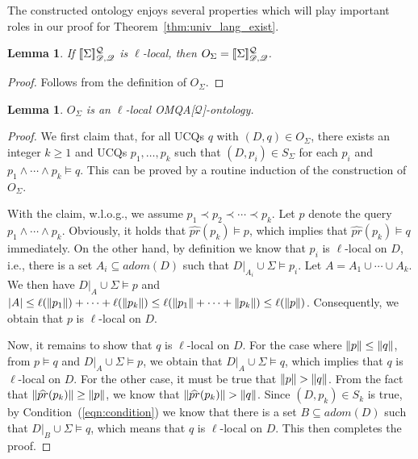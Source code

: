 \documentclass[letterpaper]{article} %
\newtheorem{lem}[thm]{Lemma}
\theoremstyle{definition}
\theoremstyle{remark}
\theoremstyle{definition}
\begin{document}
The constructed ontology enjoys several properties which will play important roles in our proof for Theorem~\ref{thm:univ_lang_exist}.

\begin{lem}\label{lem:correctness}
If $[\![\Sigma]\!]^\mathcal{Q}_{\mathscr{D},\mathscr{Q}}$ is $\ell$-local, then $O_\Sigma=[\![\Sigma]\!]^\mathcal{Q}_{\mathscr{D},\mathscr{Q}}$.
\end{lem}

\begin{proof}
Follows from the definition of $O_\Sigma$.
\end{proof}

\begin{lem}\label{lem:locality}
$O_\Sigma$ is an $\ell$-local OMQA[$\mathcal{Q}$]-ontology.
\end{lem}

\begin{proof}
We first claim that, for all UCQs $q$ with $(D,q)\in O_\Sigma$, there exists an integer $k\ge 1$ and UCQs $p_1,\dots,p_k$ such that $(D,p_i)\in S_\Sigma$ for each $p_i$ and $p_1\wedge\cdots\wedge p_k\vDash q$. This can be proved by a routine induction of the construction of $O_\Sigma$.

With the claim, w.l.o.g., we assume $p_1\prec p_2\prec\cdots\prec p_k$. Let $p$ denote the query $p_1\wedge\cdots\wedge p_k$. Obviously, it holds that $\widehat{pr}(p_k)\vDash p$, which implies that $\widehat{pr}(p_k)\vDash q$ immediately. On the other hand, by definition we know that $p_i$ is $\ell$-local on $D$, i.e., there is a set $A_i\subseteq adom(D)$ such that $D|_{A_i}\cup\Sigma\vDash p_i$. Let $A=A_1\cup\cdots\cup A_k$. We then have $D|_{A}\cup\Sigma\vDash p$ and 
$|A|\le\ell(\dl p_1\dl)+\cdots+\ell(\dl p_k\dl)\le\ell(\dl p_1\dl+\cdots+\dl p_k\dl)\le\ell(\dl p\dl)$.
Consequently, we obtain that $p$ is $\ell$-local on $D$. 

Now, it remains to show that $q$ is $\ell$-local on $D$. For the case where $\dl p\dl\le\dl q\dl$, from $p\vDash q$ and $D|_A\cup\Sigma\vDash p$, we obtain that $D|_A\cup\Sigma\vDash q$, which implies that $q$ is $\ell$-local on $D$. For the other case, it must be true that $\dl p\dl>\dl q\dl$. From the fact that $\dl\widehat{pr}(p_k)\dl\ge\dl p\dl$, we know that $\dl\widehat{pr}(p_k)\dl>\dl q\dl$. Since $(D,p_k)\in S_k$ is true, by Condition~(\ref{eqn:condition}) we know that there is a set $B\subseteq adom(D)$ such that $D|_B\cup\Sigma\vDash q$, which means that $q$ is $\ell$-local on $D$. This then completes the proof.
\end{proof}
\end{document}

